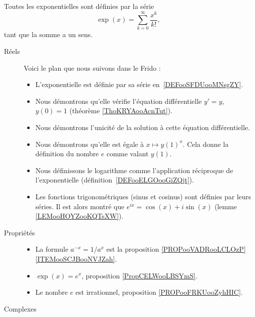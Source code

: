 
        \label{THEMEooKXSGooCsQNoY}

Toutes les exponentielles sont définies par la série
\begin{equation*}
	\exp(x)=\sum_{k=0}^{\infty}\frac{ x^k }{ k! },
\end{equation*}
tant que la somme a un sens.

\begin{description}
	\item[Réels]

	      Voici le plan que nous suivons dans le Frido :
	      \begin{itemize}
		      \item L'exponentielle est définie par sa série en~\ref{DEFooSFDUooMNsgZY}.
		      \item Nous démontrons qu'elle vérifie l'équation différentielle \( y'=y\), \( y(0)=1\) (théorème \ref{ThoKRYAooAcnTut}).
		      \item Nous démontrons l'unicité de la solution à cette équation différentielle.
		      \item Nous démontrons qu'elle est égale à \( x\mapsto y(1)^x\). Cela donne la définition du nombre \( e\) comme valant \( y(1)\).
		      \item Nous définissons le logarithme comme l'application réciproque de l'exponentielle (définition~\ref{DEFooELGOooGiZQjt}).
		      \item Les fonctions trigonométriques (sinus et cosinus) sont définies par leurs séries. Il est alors montré que \( e^{ix}=\cos(x)+i\sin(x)\) (lemme \ref{LEMooHOYZooKQTsXW}).
	      \end{itemize}

	\item[Propriétés]
	      \begin{itemize}
		      \item
		            La formule \( a^{-x}=1/a^x\) est la proposition \ref{PROPooVADRooLCLOzP}\ref{ITEMooSCJBooNVJZah}.
                \item
                    \( \exp(x)= e^{x}\), proposition \ref{PropCELWooLBSYmS}.
                \item 
                    Le nombre \( e\) est irrationnel, proposition \ref{PROPooFRKUooZyhHIC}.
	      \end{itemize}

	\item[Complexes]


\end{description}
